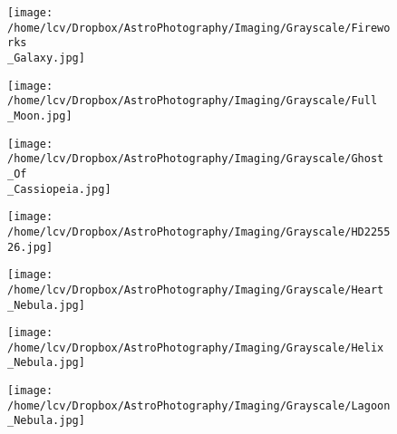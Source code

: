 \newpage
\begin{figure}[phbt]
	\texttt{[image: /home/lcv/Dropbox/AstroPhotography/Imaging/Grayscale/Fireworks\\\_Galaxy.jpg]}


\end{figure}
\newpage
\begin{figure}[phbt]
	\texttt{[image: /home/lcv/Dropbox/AstroPhotography/Imaging/Grayscale/Full\\\_Moon.jpg]}


\end{figure}
\newpage
\begin{figure}[phbt]
	\texttt{[image: /home/lcv/Dropbox/AstroPhotography/Imaging/Grayscale/Ghost\\\_Of\\\_Cassiopeia.jpg]}


\end{figure}
\newpage
\begin{figure}[phbt]
	\texttt{[image: /home/lcv/Dropbox/AstroPhotography/Imaging/Grayscale/HD225526.jpg]}


\end{figure}
\newpage
\begin{figure}[phbt]
	\texttt{[image: /home/lcv/Dropbox/AstroPhotography/Imaging/Grayscale/Heart\\\_Nebula.jpg]}


\end{figure}
\newpage
\begin{figure}[phbt]
	\texttt{[image: /home/lcv/Dropbox/AstroPhotography/Imaging/Grayscale/Helix\\\_Nebula.jpg]}


\end{figure}
\newpage
\begin{figure}[phbt]
	\texttt{[image: /home/lcv/Dropbox/AstroPhotography/Imaging/Grayscale/Lagoon\\\_Nebula.jpg]}


\end{figure}
